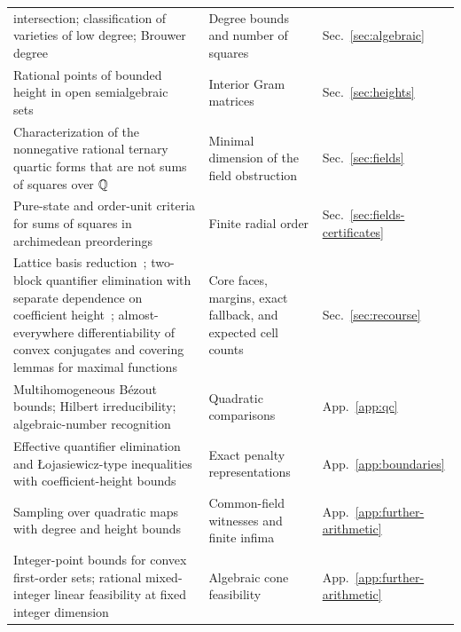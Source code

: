 {\begin{longtable}{@{}>{\raggedright\arraybackslash}p{}
  >{\raggedright\arraybackslash}p{}
  >{\raggedright\arraybackslash}p{}@{}}
intersection; classification of varieties of low degree; Brouwer
degree~\cite{Hartshorne1977,Fulton1998,EisenbudGreenHarris1996,
EklundJostPeterson2013,Harris1992,Milnor1965} & Degree bounds and number of
squares & Sec.~\ref{sec:algebraic}\\
Rational points of bounded height in open semialgebraic
sets~\cite[Theorem~4.1.2]{BasuPollackRoy1996} & Interior Gram matrices &
Sec.~\ref{sec:heights}\\
Characterization of the nonnegative rational ternary quartic forms that are
not sums of squares over $\mathbb Q$~\cite[Theorem~4.1]{Scheiderer2016} & Minimal
dimension of the field obstruction & Sec.~\ref{sec:fields}\\
Pure-state and order-unit criteria for sums of squares in archimedean
preorderings~\cite{BurgdorfScheidererSchweighofer2012} & Finite radial order &
Sec.~\ref{sec:fields-certificates}\\
Lattice basis reduction~\cite{LenstraLenstraLovasz1982}; two-block quantifier
elimination with separate dependence on coefficient
height~\cite{Renegar1992QE,BasuPollackRoy2006}; almost-everywhere
differentiability of convex conjugates and covering lemmas for maximal
functions~\cite{Rockafellar1970,EvansGariepy2015} & Core faces, margins,
exact fallback, and expected cell counts & Sec.~\ref{sec:recourse}\\
Multihomogeneous B\'ezout bounds; Hilbert irreducibility; algebraic-number
recognition~\cite{MorganSommese1987,Serre2008,KannanLenstraLovasz1988} &
Quadratic comparisons & App.~\ref{app:qc}\\
Effective quantifier elimination and {\L}ojasiewicz-type inequalities with
coefficient-height bounds~\cite{BasuMohammadNezhad2024} & Exact penalty
representations & App.~\ref{app:boundaries}\\
Sampling over quadratic maps with degree and height
bounds~\cite[Theorem~1.2]{GrigorievPasechnik2005} & Common-field witnesses
and finite infima & App.~\ref{app:further-arithmetic}\\
Integer-point bounds for convex first-order sets; rational mixed-integer
linear feasibility at fixed integer dimension~\cite{KhachiyanPorkolab2000,
Lenstra1983} & Algebraic cone feasibility &
App.~\ref{app:further-arithmetic}\\
\end{longtable}
}

